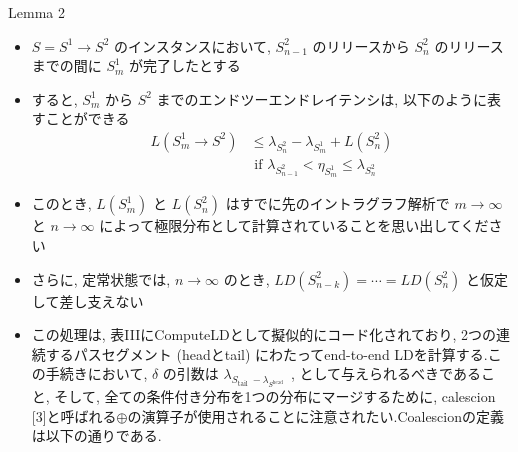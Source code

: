 \begin{frame}[label=lemma2]{Lemma 2}
    \begin{lemma}[]
        \begin{itemize}
            \item $S=S^{1} \rightarrow S^{2}$ のインスタンスにおいて, $S_{n-1}^{2}$ のリリースから $S_{n}^{2}$ のリリースまでの間に $S_{m}^{1}$ が完了したとする
\item すると, $S_{m}^{1}$ から $S^{2}$ までのエンドツーエンドレイテンシは, 以下のように表すことができる
                  \begin{equation*}
                      \begin{aligned}
                          L\left(S_{m}^{1} \rightarrow S^{2}\right) & \leq \lambda_{S_{n}^{2}}-\lambda_{S_{m}^{1}}+L\left(S_{n}^{2}\right)         \\
                                                                    & \text { if } \lambda_{S_{n-1}^{2}}<\eta_{S_{m}^{1}} \leq \lambda_{S_{n}^{2}}
                      \end{aligned}
                  \end{equation*}
        \end{itemize}
    \end{lemma}
\end{frame}

\begin{frame}{}
    \begin{itemize}
        \item このとき, $L\left(S_{m}^{1}\right)$ と $L\left(S_{n}^{2}\right)$ はすでに先のイントラグラフ解析で $m \rightarrow \infty$ と $n \rightarrow \infty$ によって極限分布として計算されていることを思い出してください
\item さらに, 定常状態では, $n \rightarrow \infty$ のとき, $L D\left(S_{n-k}^{2}\right)=\cdots=L D\left(S_{n}^{2}\right)$ と仮定して差し支えない
    \end{itemize}
\end{frame}

\begin{frame}{}
    \begin{itemize}
        \item この処理は, 表IIIにComputeLDとして擬似的にコード化されており, 2つの連続するパスセグメント (headとtail) にわたってend-to-end LDを計算する.この手続きにおいて, $\delta$ の引数は $\lambda_{S_{\text {tail }}-\lambda_{S^{\text {head }}}}$ , として与えられるべきであること, そして, 全ての条件付き分布を1つの分布にマージするために, calescion [3]と呼ばれる$\oplus$の演算子が使用されることに注意されたい.Coalescionの定義は以下の通りである.
    \end{itemize}
\end{frame}

